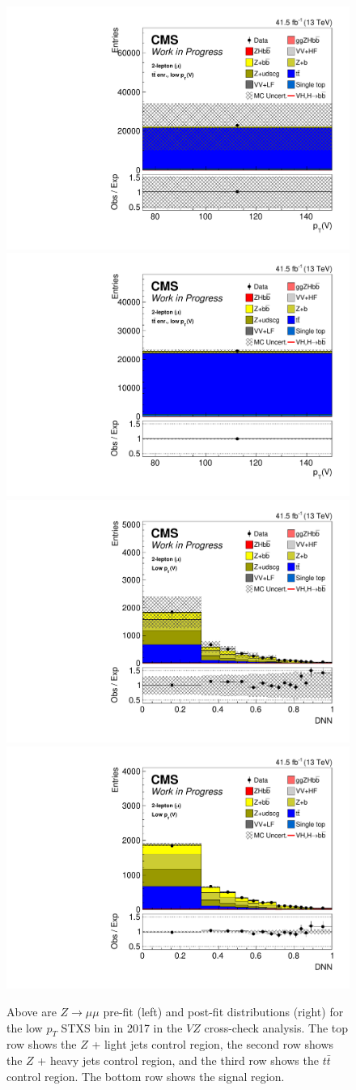 \begin{figure}
  \includegraphics[width=0.35\linewidth]{figures/210323_STXS_VZ_unblinded_XbbVZ_8fe9e9cd_postfitplots/plot_shapes_vhbb_Zmm_4_13TeV2017_prefit}
  \includegraphics[width=0.35\linewidth]{figures/210323_STXS_VZ_unblinded_XbbVZ_8fe9e9cd_postfitplots/plot_shapes_vhbb_Zmm_4_13TeV2017_postfit} \\
  \includegraphics[width=0.35\linewidth]{figures/210323_STXS_VZ_unblinded_XbbVZ_8fe9e9cd_postfitplots/plot_shapes_vhbb_Zmm_1_13TeV2017_prefit}
  \includegraphics[width=0.35\linewidth]{figures/210323_STXS_VZ_unblinded_XbbVZ_8fe9e9cd_postfitplots/plot_shapes_vhbb_Zmm_1_13TeV2017_postfit} \\
  \caption[$Z\rightarrow \mu\mu$ $V\!Z$ distributions for low $p_T$ in 2017]{
    Above are $Z\rightarrow \mu\mu$ pre-fit (left) and post-fit distributions (right)
    for the low $p_T$ STXS bin in 2017 in the $V\!Z$ cross-check analysis.
    The top row shows the $Z$ + light jets control region,
    the second row shows the $Z$ + heavy jets control region,
    and the third row shows the $t\bar{t}$ control region.
    The bottom row shows the signal region. 
  }
  \label{fig:vz-zmm-low-2017}
\end{figure}
